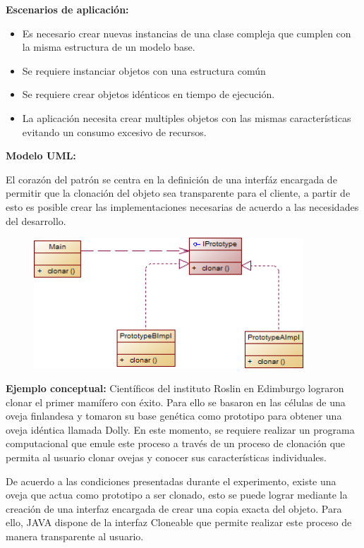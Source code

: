 \textbf{Escenarios de aplicación:}

\begin{itemize}
	\item Es necesario crear nuevas instancias de una clase compleja que cumplen con la misma estructura de un modelo base.
	\item Se requiere instanciar objetos con una estructura común
	\item Se requiere crear objetos idénticos en tiempo de ejecución.
	\item La aplicación necesita crear multiples objetos con las mismas características evitando un consumo excesivo de recursos.
\end{itemize}

\textbf{Modelo UML:}

El corazón del patrón se centra en la definición de una interfáz encargada de permitir que la clonación del objeto sea transparente para el cliente, a partir de esto es posible crear las implementaciones necesarias de acuerdo a las necesidades del desarrollo.

\begin{figure}[H]
	\includegraphics[width=0.9\textwidth]{images/creational/prototipe/prototype.png}
\end{figure}

\textbf{Ejemplo conceptual:} Científicos del instituto Roslin en Edimburgo lograron clonar el primer mamífero con éxito. Para ello se basaron en las células de una oveja finlandesa y tomaron su base genética como prototipo para obtener una oveja idéntica llamada Dolly. En este momento, se requiere realizar un programa computacional que emule este proceso a través de un proceso de clonación que permita al usuario clonar ovejas y conocer sus características individuales.

De acuerdo a las condiciones presentadas durante el experimento, existe una oveja que actua como prototipo a ser clonado, esto se puede lograr mediante la creación de una interfaz encargada de crear una copia exacta del objeto. Para ello, JAVA dispone de la interfaz Cloneable que permite realizar este proceso de manera transparente al usuario.

